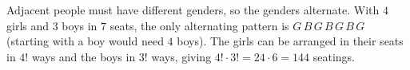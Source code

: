 Adjacent people must have different genders, so the genders alternate. With $4$ girls and $3$ boys in $7$ seats, the only alternating pattern is $G\,B\,G\,B\,G\,B\,G$ (starting with a boy would need $4$ boys). The girls can be arranged in their seats in $4!$ ways and the boys in $3!$ ways, giving $4!\cdot3!=24\cdot6=\boxed{144}$ seatings.
